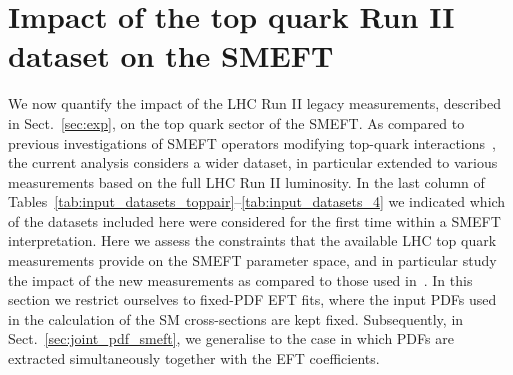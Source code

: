 \documentclass[withindex,glossary]{cam-thesis}
\begin{document}
\section{Impact of the top quark Run II dataset on the SMEFT}
\label{sec:res_smeft}

We now quantify the impact of the LHC Run II legacy measurements, described in Sect.~\ref{sec:exp},
on the top quark sector of the SMEFT.
%
As compared to previous investigations of SMEFT operators modifying top-quark
interactions~\cite{Ellis:2020unq,Ethier:2021bye,Aguilar-Saavedra:2018ksv,
  Buckley:2015lku, Brivio:2019ius, Bissmann:2019gfc, Hartland:2019bjb,
  Durieux:2019rbz, vanBeek:2019evb, Yates:2021udl}, the current analysis
considers a wider dataset, in particular extended
to various measurements based on the full LHC Run II luminosity.
%
In the last column of Tables~\ref{tab:input_datasets_toppair}--\ref{tab:input_datasets_4} we indicated
which of the datasets included here were considered
for the first time within a SMEFT interpretation.
%
Here we assess the constraints that the available LHC top quark measurements
provide on the SMEFT parameter space, and in particular study the
impact of the new measurements as compared to those used in~\cite{Ellis:2020unq,Ethier:2021bye}.
%
In this section we restrict ourselves to fixed-PDF EFT fits, where the input PDFs used in the calculation
of the SM cross-sections are kept fixed.
%
Subsequently, in Sect.~\ref{sec:joint_pdf_smeft},
we generalise to the case in which PDFs are extracted simultaneously
together with the EFT coefficients.
\end{document}
